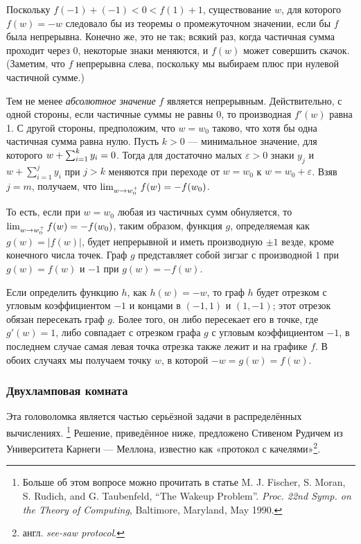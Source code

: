 Поскольку  $f(-1)+(-1)<0 <f(1)+ 1$, существование $w$, для которого $f(w)=-w$ следовало бы из теоремы о промежуточном значении, если бы $f$ была непрерывна.
Конечно же, это не так; всякий раз, когда частичная сумма проходит через 0, некоторые знаки меняются, и $f(w)$ может совершить скачок.
(Заметим, что $f$ непрерывна слева, поскольку мы выбираем плюс при нулевой частичной сумме.)

Тем не менее \emph{абсолютное значение} $f$ является непрерывным.
Действительно, с одной стороны, если частичные суммы не равны $0$, то производная $f'(w)$ равна 1.
С другой стороны, предположим, что $w=w_0$ таково, что хотя бы одна частичная сумма равна нулю.
Пусть $k>0$ --- минимальное значение, для которого $w+\sum_{i=1}^{k}y_i\z=0$.
Тогда для достаточно малых $\varepsilon>0$
знаки $y_j$ и $w+\sum_{i=1}^{j}y_i$ при $j>k$ меняются при переходе от $w=w_0$ к $w=w_0+\varepsilon$.
Взяв $j = m$, получаем, что $\lim_{w\to w_0^+}f(w)\z=-f(w_0)$.

То есть, если при $w=w_0$ любая из частичных сумм обнуляется, то $\lim_{w\to w_0^+}f(w)\z=-f(w_0)$, таким образом, функция $g$, определяемая как $g(w) =|f(w)|$, будет непрерывной и иметь производную $\pm1$ везде, кроме конечного числа точек.
Граф $g$ представляет собой зигзаг с производной $1$ при $g(w)=f(w)$ и $-1$ при $g(w)=-f(w)$.

Если определить функцию $h$, как $h (w) = -w$, то граф $h$ будет отрезком с угловым коэффициентом $-1$ и концами в $(-1,1)$ и $(1,-1)$;
этот отрезок обязан пересекать граф $g$.
Более того, он либо пересекает его в точке, где $g'(w) = 1$, либо совпадает с отрезком графа $g$ с угловым коэффициентом $-1$, в последнем случае самая левая точка отрезка также лежит и на графике $f$.
В обоих случаях мы получаем точку $w$, в которой $-w = g (w) = f (w)$. \heart

\subsubsection*{Двухламповая комната}

Эта головоломка является частью серьёзной задачи в распределённых вычислениях.%
\footnote{Больше об этом вопросе можно прочитать в статье M. J. Fischer, S. Moran, S. Rudich, and G. Taubenfeld, ``The Wakeup Problem''. \emph{Proc. 22nd Symp. on the Theory of Computing}, Baltimore, Maryland, May 1990.}
Решение, приведённое ниже, предложено Стивеном Рудичем из Университета Карнеги --- Меллона, известно как «протокол с качелями»\footnote{англ. \emph{see-saw protocol}.}.

